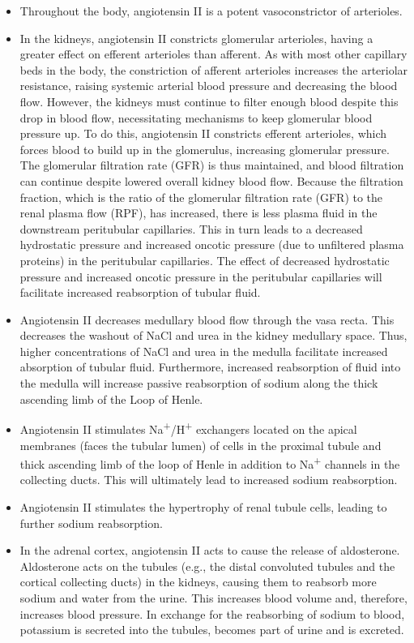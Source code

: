 \begin{itemize}
\tightlist
\item
  Throughout the body, angiotensin II is a potent vasoconstrictor of arterioles.
\item
  In the kidneys, angiotensin II constricts glomerular arterioles, having a greater effect on efferent arterioles than afferent. As with most other capillary beds in the body, the constriction of afferent arterioles increases the arteriolar resistance, raising systemic arterial blood pressure and decreasing the blood flow. However, the kidneys must continue to filter enough blood despite this drop in blood flow, necessitating mechanisms to keep glomerular blood pressure up. To do this, angiotensin II constricts efferent arterioles, which forces blood to build up in the glomerulus, increasing glomerular pressure. The glomerular filtration rate (GFR) is thus maintained, and blood filtration can continue despite lowered overall kidney blood flow. Because the filtration fraction, which is the ratio of the glomerular filtration rate (GFR) to the renal plasma flow (RPF), has increased, there is less plasma fluid in the downstream peritubular capillaries. This in turn leads to a decreased hydrostatic pressure and increased oncotic pressure (due to unfiltered plasma proteins) in the peritubular capillaries. The effect of decreased hydrostatic pressure and increased oncotic pressure in the peritubular capillaries will facilitate increased reabsorption of tubular fluid.
\item
  Angiotensin II decreases medullary blood flow through the vasa recta. This decreases the washout of NaCl and urea in the kidney medullary space. Thus, higher concentrations of NaCl and urea in the medulla facilitate increased absorption of tubular fluid. Furthermore, increased reabsorption of fluid into the medulla will increase passive reabsorption of sodium along the thick ascending limb of the Loop of Henle.
\item
  Angiotensin II stimulates Na\textsuperscript{+}/H\textsuperscript{+} exchangers located on the apical membranes (faces the tubular lumen) of cells in the proximal tubule and thick ascending limb of the loop of Henle in addition to Na\textsuperscript{+} channels in the collecting ducts. This will ultimately lead to increased sodium reabsorption.
\item
  Angiotensin II stimulates the hypertrophy of renal tubule cells, leading to further sodium reabsorption.
\item
  In the adrenal cortex, angiotensin II acts to cause the release of aldosterone. Aldosterone acts on the tubules (e.g., the distal convoluted tubules and the cortical collecting ducts) in the kidneys, causing them to reabsorb more sodium and water from the urine. This increases blood volume and, therefore, increases blood pressure. In exchange for the reabsorbing of sodium to blood, potassium is secreted into the tubules, becomes part of urine and is excreted.

\end{itemize}
